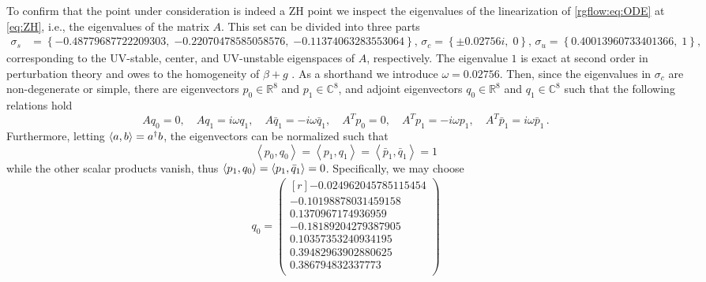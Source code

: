 \begin{subappendices}
To confirm that the point under consideration is indeed a ZH point we
inspect the eigenvalues of the linearization of \cref{rgflow:eq:ODE} at
\cref{eq:ZH}, i.e., the eigenvalues of the matrix $A$. This set can be divided
into three parts
\begin{align*}
    \sigma_s &= 
\left\{
    \num{-0.48779687722209303}, \;
    \num{-0.22070478585058576}, \;
    \num{-0.11374063283553064}
\right\}, \,
    \sigma_c = 
\left\{
   \pm 0.02756 i,\;
    0
\right\}, \,
    \sigma_u = 
\left\{
    \num{0.40013960733401366}, \;
    1
\right\},
\end{align*}
corresponding to the UV-stable, center, and UV-unstable eigenspaces of $A$, respectively. The eigenvalue $1$ is exact at second order in perturbation theory and owes to the homogeneity of $\beta+g$ \cite{Jepsen:2020czw}. 
As a shorthand we introduce $\omega = 0.02756$.
Then, since the eigenvalues in $\sigma_c$ are non-degenerate or simple, there are eigenvectors $p_0\in
\mathbb R^8$ and $p_1 \in \mathbb C^8$, and adjoint eigenvectors $q_0\in \mathbb R^8$
and $q_1 \in \mathbb C^8$ such that the following relations hold
\begin{equation} \label{rgflow:eq:eigenvectors}
    A q_0 = 0, \quad A q_1 = i \omega q_1, \quad A \bar{q}_1 = - i \omega \bar{q}_1, 
    \quad A^T p_0 = 0, \quad A^T p_1 = -i \omega p_1, \quad A^T \bar{p}_1= i \omega \bar{p}_1 \,.
\end{equation}
Furthermore, letting $\braket{a,b} = a^\dagger b$, the eigenvectors can be normalized such that
\begin{equation} \label{eq:normalization}
    \left< p_0, q_0 \right> = \left< p_1, q_1 \right> = \left< \bar{p}_1, \bar{q}_1 \right> =1 %
\end{equation}
while the other scalar products vanish, thus $\braket{p_1,q_0} = \braket{p_1,\bar{q}_1} = 0$. Specifically, we may choose
\begin{gather}
    q_0 =
    \begin{pmatrix*}[r]
        \num{-0.024962045785115454}\\
        \num{-0.10198878031459158}\\
        \num{0.1370967174936959}\\
        \num{-0.18189204279387905}\\
        \num{0.10357353240934195}\\
        \num{0.39482963902880625}\\
        \num{0.386794832337773}\\

\end{pmatrix*}
\end{gather}
\end{subappendices}
